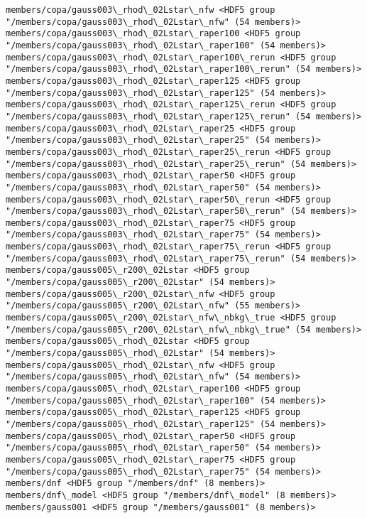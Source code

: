 \documentclass[11pt]{article}
\begin{document}
\begin{Verbatim}[commandchars=\\\{\}]
members/copa/gauss003\_rhod\_02Lstar\_nfw <HDF5 group "/members/copa/gauss003\_rhod\_02Lstar\_nfw" (54 members)>
members/copa/gauss003\_rhod\_02Lstar\_raper100 <HDF5 group "/members/copa/gauss003\_rhod\_02Lstar\_raper100" (54 members)>
members/copa/gauss003\_rhod\_02Lstar\_raper100\_rerun <HDF5 group "/members/copa/gauss003\_rhod\_02Lstar\_raper100\_rerun" (54 members)>
members/copa/gauss003\_rhod\_02Lstar\_raper125 <HDF5 group "/members/copa/gauss003\_rhod\_02Lstar\_raper125" (54 members)>
members/copa/gauss003\_rhod\_02Lstar\_raper125\_rerun <HDF5 group "/members/copa/gauss003\_rhod\_02Lstar\_raper125\_rerun" (54 members)>
members/copa/gauss003\_rhod\_02Lstar\_raper25 <HDF5 group "/members/copa/gauss003\_rhod\_02Lstar\_raper25" (54 members)>
members/copa/gauss003\_rhod\_02Lstar\_raper25\_rerun <HDF5 group "/members/copa/gauss003\_rhod\_02Lstar\_raper25\_rerun" (54 members)>
members/copa/gauss003\_rhod\_02Lstar\_raper50 <HDF5 group "/members/copa/gauss003\_rhod\_02Lstar\_raper50" (54 members)>
members/copa/gauss003\_rhod\_02Lstar\_raper50\_rerun <HDF5 group "/members/copa/gauss003\_rhod\_02Lstar\_raper50\_rerun" (54 members)>
members/copa/gauss003\_rhod\_02Lstar\_raper75 <HDF5 group "/members/copa/gauss003\_rhod\_02Lstar\_raper75" (54 members)>
members/copa/gauss003\_rhod\_02Lstar\_raper75\_rerun <HDF5 group "/members/copa/gauss003\_rhod\_02Lstar\_raper75\_rerun" (54 members)>
members/copa/gauss005\_r200\_02Lstar <HDF5 group "/members/copa/gauss005\_r200\_02Lstar" (54 members)>
members/copa/gauss005\_r200\_02Lstar\_nfw <HDF5 group "/members/copa/gauss005\_r200\_02Lstar\_nfw" (55 members)>
members/copa/gauss005\_r200\_02Lstar\_nfw\_nbkg\_true <HDF5 group "/members/copa/gauss005\_r200\_02Lstar\_nfw\_nbkg\_true" (54 members)>
members/copa/gauss005\_rhod\_02Lstar <HDF5 group "/members/copa/gauss005\_rhod\_02Lstar" (54 members)>
members/copa/gauss005\_rhod\_02Lstar\_nfw <HDF5 group "/members/copa/gauss005\_rhod\_02Lstar\_nfw" (54 members)>
members/copa/gauss005\_rhod\_02Lstar\_raper100 <HDF5 group "/members/copa/gauss005\_rhod\_02Lstar\_raper100" (54 members)>
members/copa/gauss005\_rhod\_02Lstar\_raper125 <HDF5 group "/members/copa/gauss005\_rhod\_02Lstar\_raper125" (54 members)>
members/copa/gauss005\_rhod\_02Lstar\_raper50 <HDF5 group "/members/copa/gauss005\_rhod\_02Lstar\_raper50" (54 members)>
members/copa/gauss005\_rhod\_02Lstar\_raper75 <HDF5 group "/members/copa/gauss005\_rhod\_02Lstar\_raper75" (54 members)>
members/dnf <HDF5 group "/members/dnf" (8 members)>
members/dnf\_model <HDF5 group "/members/dnf\_model" (8 members)>
members/gauss001 <HDF5 group "/members/gauss001" (8 members)>

\end{Verbatim}
\end{document}
